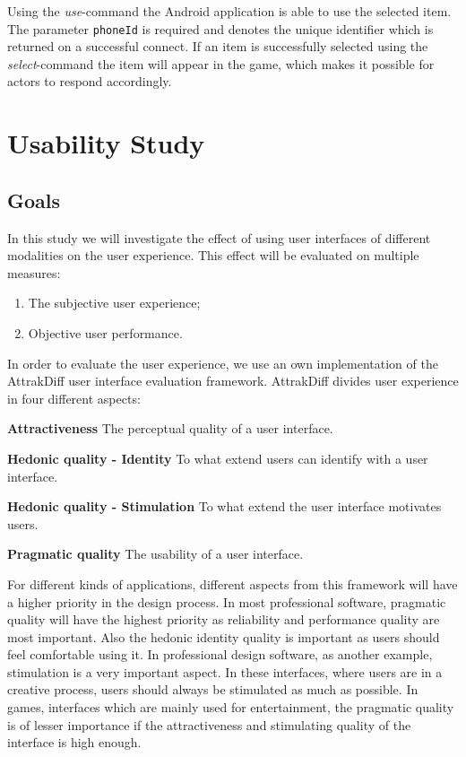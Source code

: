 \documentclass[a4paper,10pt]{report}
\begin{document}
		\noindent Using the \emph{use}-command the Android application is able to use the selected item.
		The parameter \texttt{phoneId} is required and denotes the unique identifier which is returned on a successful connect.
		If an item is successfully selected using the \emph{select}-command the item will appear in the game, which makes it possible for actors to respond accordingly.

\chapter{Usability Study}
\label{chap:usabilitystudy}

\section{Goals}
In this study we will investigate the effect of using user interfaces of different modalities on the user experience.
This effect will be evaluated on multiple measures: 
\begin{enumerate}
	\item The subjective user experience;
	\item Objective user performance.
\end{enumerate}

In order to evaluate the user experience, we use an own implementation of the AttrakDiff user interface evaluation framework.
AttrakDiff divides user experience in four different aspects: 
\begin{description}
  \item
		\textbf{Attractiveness}
		The perceptual quality of a user interface.
  \item
		\textbf{Hedonic quality - Identity}
		To what extend users can identify with a user interface.
  \item
		\textbf{Hedonic quality - Stimulation}
		To what extend the user interface motivates users.
  \item
		\textbf{Pragmatic quality}
		The usability of a user interface.
\end{description} 

For different kinds of applications, different aspects from this framework will have a higher priority in the design process.
In most professional software, pragmatic quality will have the highest priority as reliability and performance quality are most important.
Also the hedonic identity quality is important as users should feel comfortable using it.
In professional design software, as another example, stimulation is a very important aspect.
In these interfaces, where users are in a creative process, users should always be stimulated as much as possible.
In games, interfaces which are mainly used for entertainment, the pragmatic quality is of lesser importance if the attractiveness and stimulating quality of the interface is high enough.
 
\end{document}
